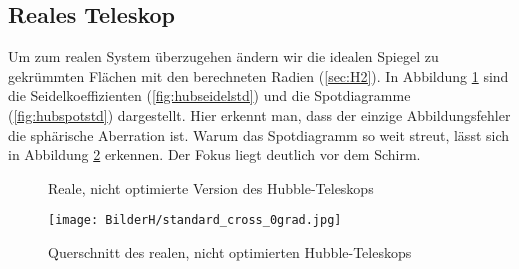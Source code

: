 \documentclass[twoside,colorback,accentcolor=tud4c,11pt]{tudreport}
\begin{document}
\subsection{Reales Teleskop}
Um zum realen System überzugehen ändern wir die idealen Spiegel zu gekrümmten Flächen mit den berechneten Radien (\ref{sec:H2}). In Abbildung \ref{fig:hubstd} sind die Seidelkoeffizienten (\ref{fig:hubseidelstd}) und die Spotdiagramme (\ref{fig:hubspotstd}) dargestellt. Hier erkennt man, dass der einzige Abbildungsfehler die sphärische Aberration ist. Warum das Spotdiagramm so weit streut, lässt sich in Abbildung \ref{fig:hubcrossstd} erkennen. Der Fokus liegt deutlich vor dem Schirm.
\begin{figure}[H]
\centering
  \quad
  \quad   
  \caption{Reale, nicht optimierte Version des Hubble-Teleskops}
  \label{fig:hubstd}
  
\end{figure}
\begin{figure}[H]
\centering
   	\begin{minipage}[b]{\textwidth}
   	\texttt{[image: BilderH/standard\_cross\_0grad.jpg]}
   	\caption{Querschnitt des realen, nicht optimierten Hubble-Teleskops}
  	\label{fig:hubcrossstd}
   	\end{minipage}
\end{figure}
\end{document}
